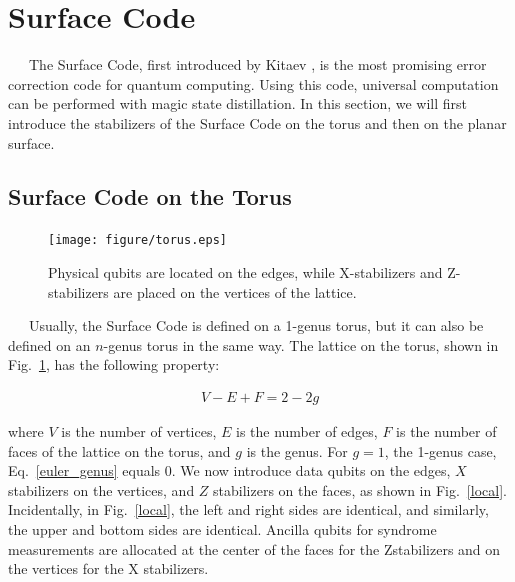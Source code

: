 \documentclass[a4paper,11pt]{ltjsarticle}
\begin{document}
\section{Surface Code}\label{surface_code}{
    \ \ \ The Surface Code, first introduced by Kitaev \cite{kitaev1997}, is the most promising error correction code for quantum computing. Using this code, universal computation can be performed with magic state distillation. In this section, we will first introduce the stabilizers of the Surface Code on the torus and then on the planar surface.

    \subsection{Surface Code on the Torus}{

        \begin{figure}[h]
            \centering
            \texttt{[image: figure/torus.eps]}
            \vspace{0pt}\caption{Physical qubits are located on the edges, while X-stabilizers and Z-stabilizers are placed on the vertices of the lattice.}
            \label{torus}
        \end{figure}

        \ \ \ Usually, the Surface Code is defined on a 1-genus torus, but it can also be defined on an $n$-genus torus in the same way. The lattice on the torus, shown in Fig.~\ref{torus}, has the following property:

        \begin{align}\label{euler_genus}
            V-E+F=2-2g
        \end{align}
        
        where $V$ is the number of vertices, $E$ is the number of edges, $F$ is the number of faces of the lattice on the torus, and $g$ is the genus. For $g = 1$, the 1-genus case, Eq.~\ref{euler_genus} equals $0$. We now introduce data qubits on the edges, $X$ stabilizers on the vertices, and $Z$ stabilizers on the faces, as shown in Fig.~\ref{local}. Incidentally, in Fig.~\ref{local}, the left and right sides are identical, and similarly, the upper and bottom sides are identical. Ancilla qubits for syndrome measurements are allocated at the center of the faces for the Zstabilizers and on the vertices for the X stabilizers.

}}
\end{document}
